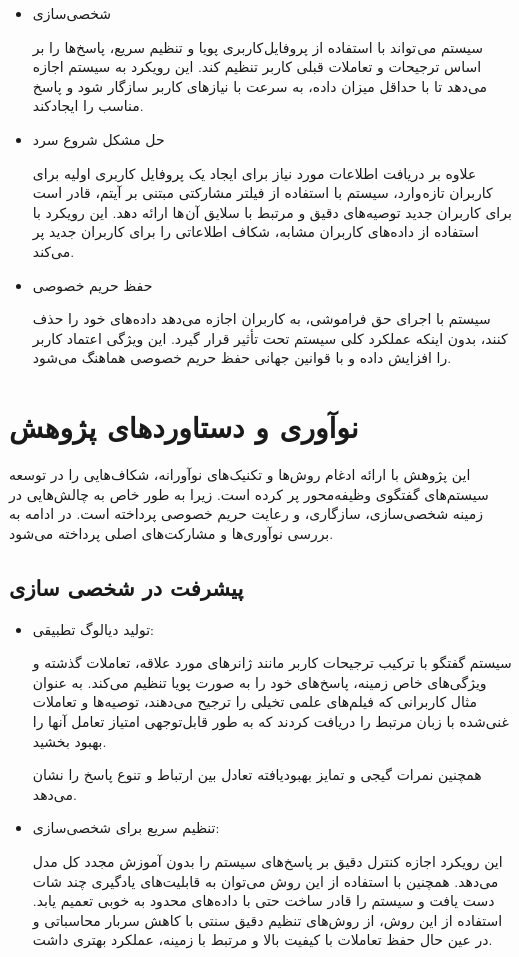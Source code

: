 \begin{itemize}
\item
شخصی‌سازی

سیستم می تواند با استفاده از پروفایل کاربری پویا و تنظیم سریع، پاسخ‌ها را بر اساس ترجیحات و تعاملات قبلی کاربر تنظیم ‌کند. این رویکرد به سیستم اجازه می‌دهد تا با حداقل میزان داده، به سرعت با نیازهای کاربر سازگار شود و پاسخ مناسب را ایجادکند.
\item
حل مشکل شروع سرد

علاوه بر دریافت اطلاعات مورد نیاز برای ایجاد یک پروفایل کاربری اولیه برای کاربران تازه وارد، سیستم با استفاده از فیلتر مشارکتی مبتنی بر آیتم، قادر است برای کاربران جدید توصیه‌های دقیق و مرتبط با سلایق آن ها ارائه دهد. این رویکرد با استفاده از داده‌های کاربران مشابه، شکاف اطلاعاتی را برای کاربران جدید پر می‌کند.
\item
حفظ حریم خصوصی

سیستم با اجرای حق فراموشی، به کاربران اجازه می‌دهد داده‌های خود را حذف کنند، بدون اینکه عملکرد کلی سیستم تحت تأثیر قرار گیرد. این ویژگی اعتماد کاربر را افزایش داده و با قوانین جهانی حفظ حریم خصوصی هماهنگ می‌شود.
\end{itemize}


\section{نوآوری و دستاوردهای پژوهش}
این پژوهش با ارائه ادغام روش‌ها و تکنیک‌های نوآورانه، شکاف‌هایی را در توسعه سیستم‌های گفتگوی وظیفه‌محور پر کرده است. زیرا به طور خاص به چالش‌هایی در زمینه شخصی‌سازی، سازگاری، و رعایت حریم خصوصی پرداخته است. در ادامه به بررسی نوآوری‌ها و مشارکت‌های اصلی پرداخته می‌شود.

\subsection{پیشرفت در شخصی سازی}
\begin{itemize}
\item
تولید دیالوگ تطبیقی:
 
سیستم گفتگو با ترکیب ترجیحات کاربر مانند ژانرهای مورد علاقه، تعاملات گذشته و ویژگی‌های خاص زمینه، پاسخ‌های خود را به صورت پویا تنظیم می‌کند. به عنوان مثال کاربرانی که فیلم‌های علمی تخیلی را ترجیح می‌دهند، توصیه‌ها و تعاملات غنی‌شده با زبان مرتبط را دریافت کردند که به طور قابل‌توجهی امتیاز تعامل آنها را بهبود بخشید.

همچنین نمرات گیجی و تمایز بهبود‌یافته تعادل بین ارتباط و تنوع پاسخ را نشان می‌دهد.
\item
 تنظیم سریع برای شخصی‌سازی:

 این رویکرد اجازه کنترل دقیق بر پاسخ‌های سیستم را بدون آموزش مجدد کل مدل می‌دهد. همچنین با استفاده از این روش می‌توان به قابلیت‌های یادگیری چند شات دست یافت و سیستم را قادر ساخت حتی با داده‌های محدود به خوبی تعمیم یابد.
استفاده از این روش، از روش‌های تنظیم دقیق سنتی با کاهش سربار محاسباتی و در عین حال حفظ تعاملات با کیفیت بالا و مرتبط با زمینه، عملکرد بهتری داشت.
\end{itemize}
